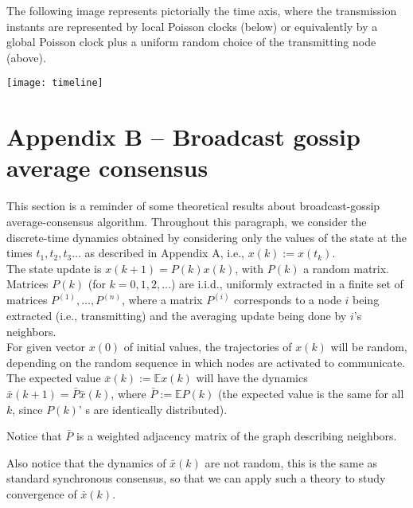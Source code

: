 \documentclass[oneside]{article}
\begin{document}
The following image represents pictorially
the time axis, where the transmission instants are represented by local Poisson clocks (below) or equivalently by a global Poisson clock plus a uniform random choice of the transmitting node (above).
\begin{center}
\texttt{[image: timeline]}
\end{center}






\section*{Appendix B -- Broadcast gossip average consensus}

This section is a reminder of some theoretical results about broadcast-gossip average-consensus algorithm.
%
Throughout this paragraph, we consider the discrete-time dynamics obtained by considering only the values of the state at the times $t_1, t_2, t_3 \dots$ as described in Appendix A, i.e., $x(k) := x(t_k)$. \\

The state update is $x(k+1) = P(k) x(k)$, with $P(k)$ a random matrix. Matrices $P(k)$ (for $k=0,1,2,\dots$) are i.i.d., uniformly extracted in a finite set of matrices $P^{(1)}, \dots, P^{(n)}$,  where a matrix $P^{(i)}$ corresponds to a node $i$ being extracted (i.e., transmitting) and the averaging update being done by $i$'s neighbors.\\


For given vector $x(0)$ of initial values, the trajectories of $x(k)$  will be random, depending on the random sequence in which nodes are activated to communicate. The expected value $\bar x(k) := \mathbb E x(k)$ will have the dynamics $\bar x(k+1) = \bar P \bar x(k)$, where $\bar P := \mathbb E P(k)$ (the expected value is the same for all $k$, since $P(k)$' s are identically distributed).

Notice that $\bar P$ is a weighted adjacency matrix of the graph describing neighbors.

Also notice that the dynamics of $\bar x(k)$ are not random, this is the same as standard synchronous consensus, so that we can apply such a theory to study convergence of $\bar x(k)$.\\
\end{document}
